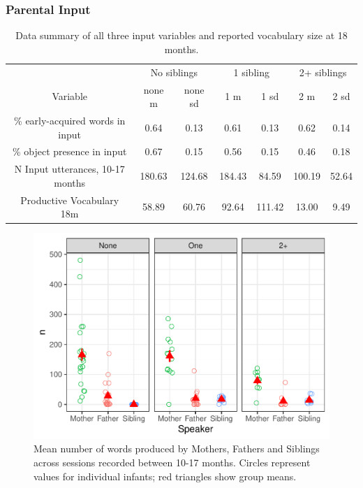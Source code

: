 \documentclass[
  english,
  man,floatsintext]{apa6}
\begin{document}
\hypertarget{parental-input}{%
\subsubsection{Parental Input}\label{parental-input}}

\begin{table}

\caption{\label{tab:table-data-summary}Data summary of all three input variables and reported vocabulary size at 18 months.}
\centering
\begin{tabular}[t]{ccccccc}
\toprule
\multicolumn{1}{c}{ } & \multicolumn{2}{c}{No siblings} & \multicolumn{2}{c}{1 sibling} & \multicolumn{2}{c}{2+ siblings} \\
\cmidrule(l{3pt}r{3pt}){2-3} \cmidrule(l{3pt}r{3pt}){4-5} \cmidrule(l{3pt}r{3pt}){6-7}
Variable & none m & none sd & 1 m & 1 sd & 2 m & 2 sd\\
\midrule
\% early-acquired words in input & 0.64 & 0.13 & 0.61 & 0.13 & 0.62 & 0.14\\
\% object presence in input & 0.67 & 0.15 & 0.56 & 0.15 & 0.46 & 0.18\\
N Input utterances, 10-17 months & 180.63 & 124.68 & 184.43 & 84.59 & 100.19 & 52.64\\
Productive Vocabulary 18m & 58.89 & 60.76 & 92.64 & 111.42 & 13.00 & 9.49\\
\bottomrule
\end{tabular}
\end{table}

\begin{figure}
\centering
\includegraphics{SiblingsStudyText_files/figure-latex/Figure-Speaker-count-1.pdf}
\caption{\label{fig:Figure-Speaker-count}Mean number of words produced by Mothers, Fathers and Siblings across sessions recorded between 10-17 months. Circles represent values for individual infants; red triangles show group means.}
\end{figure}
\end{document}
